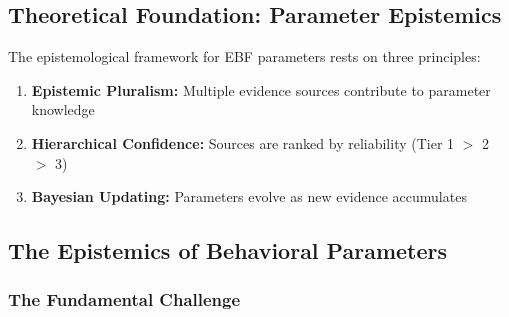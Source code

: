 \begin{abstract}
This appendix provides the methodological foundations for parameter estimation
in the EBF framework. We address the fundamental question: \textit{Where do
the numbers come from?} We present a three-tier hybrid estimation strategy that
integrates hard empirical data, meta-analytical calibration, and synthetic priors
from large language models. The appendix serves as the central ``Estimation Hub''
connecting Appendix LLM1 (LLM Monte Carlo), Appendix OPS (Empirical Operationalization),
and Chapter 4 (Calibration).
\end{abstract}

\subsection{Theoretical Foundation: Parameter Epistemics}
\label{sec:BBB-theory}

The epistemological framework for EBF parameters rests on three principles:

\begin{enumerate}
    \item \textbf{Epistemic Pluralism:} Multiple evidence sources contribute to parameter knowledge
    \item \textbf{Hierarchical Confidence:} Sources are ranked by reliability (Tier 1 $>$ 2 $>$ 3)
    \item \textbf{Bayesian Updating:} Parameters evolve as new evidence accumulates
\end{enumerate}

\subsection{The Epistemics of Behavioral Parameters}
\label{sec:BBB-epistemics}

\subsubsection{The Fundamental Challenge}

